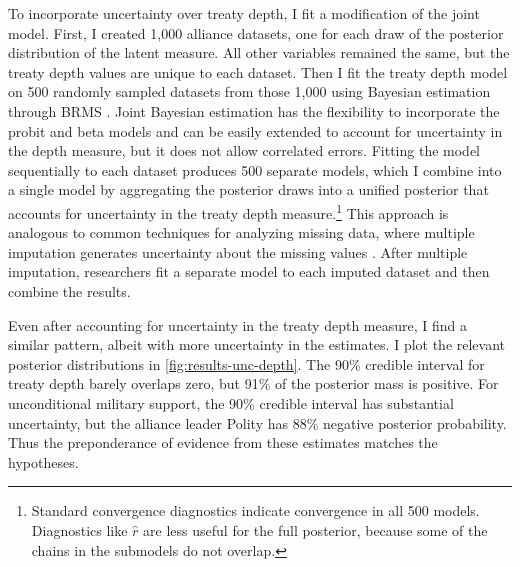 \documentclass[12pt]{article}
\begin{document}
To incorporate uncertainty over treaty depth, I fit a modification of the joint model. 
First, I created 1,000 alliance datasets, one for each draw of the posterior distribution of the latent measure.
All other variables remained the same, but the treaty depth values are unique to each dataset. 
Then I fit the treaty depth model on 500 randomly sampled datasets from those 1,000 using Bayesian estimation through BRMS \citep{Buerkner2017}. 
Joint Bayesian estimation has the flexibility to incorporate the probit and beta models and can be easily extended to account for uncertainty in the depth measure, but it does not allow correlated errors. 
Fitting the model sequentially to each dataset produces 500 separate models, which I combine into a single model by aggregating the posterior draws into a unified posterior that accounts for uncertainty in the treaty depth measure.\footnote{Standard convergence diagnostics indicate convergence in all 500 models. Diagnostics like $\hat{r}$ are less useful for the full posterior, because some of the chains in the submodels do not overlap.}
This approach is analogous to common techniques for analyzing missing data, where multiple imputation generates uncertainty about the missing values \citep{Hollenbachetal2018imp}.
After multiple imputation, researchers fit a separate model to each imputed dataset and then combine the results. 


Even after accounting for uncertainty in the treaty depth measure, I find a similar pattern, albeit with more uncertainty in the estimates. 
I plot the relevant posterior distributions in \autoref{fig:results-unc-depth}. 
The 90\% credible interval for treaty depth barely overlaps zero, but 91\% of the posterior mass is positive. 
For unconditional military support, the 90\% credible interval has substantial uncertainty, but the alliance leader Polity has 88\% negative posterior probability. 
Thus the preponderance of evidence from these estimates matches the hypotheses. 
\end{document}
